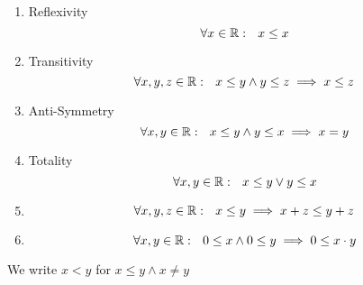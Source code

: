 \documentclass[../../script.tex]{subfiles}
\begin{document}
\begin{defi}\leavevmode
\begin{enumerate}[label=O\arabic*:]
	\item Reflexivity
	\[
		\forall x \in \mathbb{R}: ~~x \le x
	\]
	
	\item Transitivity
	\[
		\forall x, y, z \in \mathbb{R}: ~~x \le y \wedge y \le z \implies x \le z
	\]
	
	\item Anti-Symmetry
	\[
		\forall x, y \in \mathbb{R}: ~~x \le y \wedge y \le x \implies x = y
	\]
	
	\item Totality
	\[
		\forall x, y \in \mathbb{R}: ~~x \le y \vee y \le x
	\]
	
	\item 
	\[
		\forall x, y, z \in \mathbb{R}: ~~x \le y \implies x + z \le y + z
	\]
	
	\item 
	\[
		\forall x, y \in \mathbb{R}: ~~0 \le x \wedge 0 \le y \implies 0 \le x \cdot y
	\]
\end{enumerate}
We write $x < y$ for $x \le y \wedge x \ne y$
\end{defi}
\end{document}
